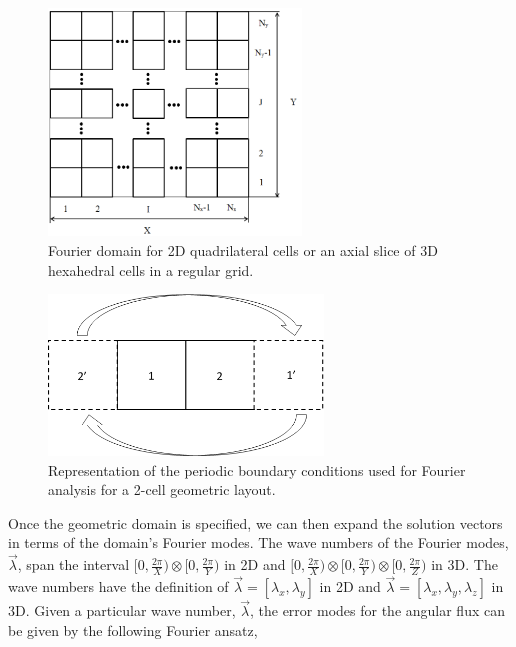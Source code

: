 \begin{figure}
\centering
\includegraphics[width=0.60\textwidth]{figures/sec_DSA/fourier_sq_layout.png}
\caption[Fourier domain]{Fourier domain for 2D quadrilateral cells or an axial slice of 3D hexahedral cells in a regular grid.}
\label{fig::DSA_fourier_grid_layout}
\end{figure}

\begin{figure}
\centering
\includegraphics[width=0.65\textwidth]{figures/sec_DSA/Fourier_periodic_BC.png}
\caption[Fourier periodic boundary conditions]{Representation of the periodic boundary conditions used for Fourier analysis for a 2-cell geometric layout.}
\label{fig::DSA_fourier_periodic_BC}
\end{figure}

Once the geometric domain is specified, we can then expand the solution vectors in terms of the domain's Fourier modes. The wave numbers of the Fourier modes, $\vec{\lambda}$, span the interval $[0,\frac{2 \pi}{X}) \otimes [0,\frac{2 \pi}{Y})$ in 2D and $[0,\frac{2 \pi}{X}) \otimes [0,\frac{2 \pi}{Y})\otimes [0,\frac{2 \pi}{Z})$ in 3D. The wave numbers have the definition of $\vec{\lambda} = [\lambda_x, \lambda_y]$ in 2D and $\vec{\lambda} = [\lambda_x, \lambda_y, \lambda_z]$ in 3D. Given a particular wave number, $\vec{\lambda}$, the error modes for the angular flux can be given by the following Fourier ansatz,

